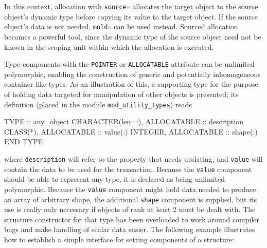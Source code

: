 \documentclass[
]{article}
\newenvironment{Shaded}{}{}
\newcommand{\DataTypeTok}[1]{\textcolor[rgb]{0.56,0.13,0.00}{#1}}
\newcommand{\FunctionTok}[1]{\textcolor[rgb]{0.02,0.16,0.49}{#1}}
\newcommand{\NormalTok}[1]{#1}
\begin{document}
In this context, allocation with \texttt{source=} allocates the target
object to the source object's dynamic type before copying its value to
the target object. If the source object's data is not needed,
\texttt{mold=} can be used instead. Sourced allocation becomes a
powerful tool, since the dynamic type of the source object need not be
known in the scoping unit within which the allocation is executed.

Type components with the \texttt{POINTER} or \texttt{ALLOCATABLE}
attribute can be unlimited polymorphic, enabling the construction of
generic and potentially inhomogeneous container-like types. As an
illustration of this, a supporting type for the purpose of holding data
targeted for manipulation of other objects is presented; its definition
(placed in the module \texttt{mod\_utility\_types}) reads

\begin{Shaded}
\begin{Highlighting}[]
\DataTypeTok{TYPE} \DataTypeTok{::}\NormalTok{ any\_object}
   \DataTypeTok{CHARACTER(len=:)}\NormalTok{, }\DataTypeTok{ALLOCATABLE} \DataTypeTok{::}\NormalTok{ description}
   \DataTypeTok{CLASS(*)}\NormalTok{, }\DataTypeTok{ALLOCATABLE} \DataTypeTok{::} \DataTypeTok{value}\NormalTok{(:)}
   \DataTypeTok{INTEGER}\NormalTok{, }\DataTypeTok{ALLOCATABLE} \DataTypeTok{::} \FunctionTok{shape}\NormalTok{(:)}
\DataTypeTok{END TYPE}
\end{Highlighting}
\end{Shaded}

where \texttt{description} will refer to the property that needs
updating, and \texttt{value} will contain the data to be used for the
transaction. Because the \texttt{value} component should be able to
represent any type, it is declared as being unlimited polymorphic.
Because the \texttt{value} component might hold data needed to produce
an array of arbitrary shape, the additional \texttt{shape} component is
supplied, but its use is really only necessary if objects of rank at
least 2 must be dealt with. The structure constructor for that type has
been overloaded to work around compiler bugs and make handling of scalar
data easier. The following example illustrates how to establish a simple
interface for setting components of a structure:
\end{document}
